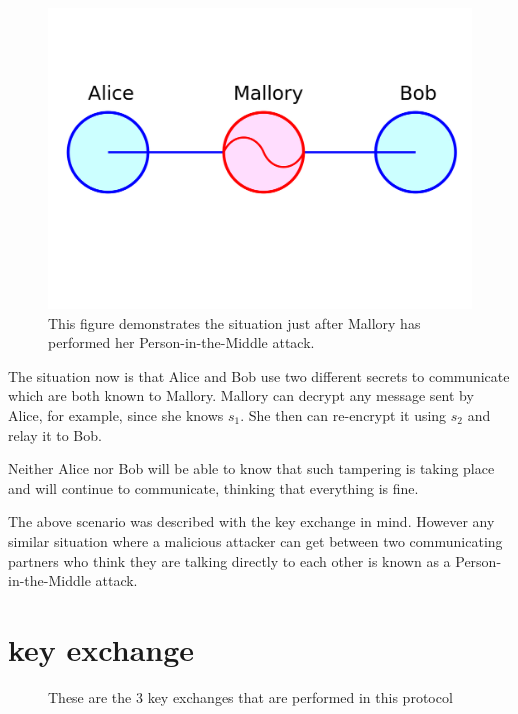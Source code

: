 \begin{figure}[h]
\includegraphics[scale=0.4]{Figures/Person_in_the_middle_attack.jpg}
\caption[A Person-in-the-Middle attack]{This figure demonstrates the situation just after Mallory has performed her Person-in-the-Middle attack.}
\end{figure}

The situation now is that Alice and Bob use two different secrets to communicate which are both known to Mallory. Mallory can decrypt any message sent by Alice, for example, since she knows $s_1$.
She then can re-encrypt it using $s_2$ and relay it to Bob.

Neither Alice nor Bob will be able to know that such tampering is taking place and will continue to communicate, thinking that everything is fine.

The above scenario was described with the \dhname key exchange in mind. However any similar situation where a malicious attacker can get between two communicating partners who think they are talking directly to each other is known as a Person-in-the-Middle attack.

\section{\tdhname key exchange}
\begin{figure}[h]
\begin{centering}
  
  \caption[\tdhname in a picture]{These are the 3 \dhname key exchanges that are performed in this protocol}
\end{centering}
\end{figure}

